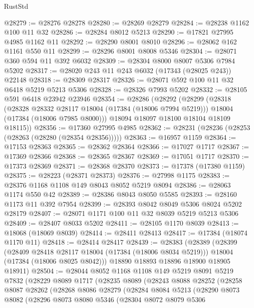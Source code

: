 \begin{lexlean}{RustStd}
\begin{coremodule}
@28279 := @28276 @28278
@28280 := @28269 @28279
@28284 := @28238 @1162 @100 @11 @32
@28286 := @28284 @8012 @5213
@28290 := @17821 @27995 @4985 @1162 @11
@28292 := @28290 @8001 @8010
@28296 := @28062 @162 @1161 @550 @11
@28299 := @28296 @8001 @8008 @5346
@28304 := @28071 @360 @594 @11 @392 @6032
@28309 := @28304 @8000 @8007 @5306 @7984 @5202
@28317 := @28020 @243 @11 @243 @6032 (@17343 (@28025 @243)) @22148
@28318 := @28309 @28317
@28326 := @28071 @592 @100 @11 @32 @6418 @5219 @5213 @5306
@28328 := @28326 @7993 @5202
@28332 := @28105 @591 @6418 @23942 @23946
@28354 := @28286
    (@28292
      (@28299
        (@28318
          (@28328 @28332 @28117 @18004 (@17384 (@18006 @7994 @5219)))
          @18004
          (@17384 (@18006 @7985 @8000)))
        @18094
        @18097
        @18100
        @18104
        @18109
        @18115))
@28356 := @17360 @27995 @4985
@28362 := @28231 (@28236 (@28253 (@28263 (@28280 (@28354 @28356)))))
@28363 := @16957 @1159
@28364 := @17153 @28363
@28365 := @28362 @28364
@28366 := @17027 @1717
@28367 := @17369 @28366
@28368 := @28365 @28367
@28369 := @17051 @1717
@28370 := @17373 @28369
@28371 := @28368 @28370
@28373 := @17378 (@17380 @1159)
@28375 := @28223 (@28371 @28373)
@28376 := @27998 @1175
@28383 := @28376 @1168 @1108 @149 @8043 @8052 @5219 @8094
@28386 := @28063 @1174 @550 @42
@28389 := @28386 @8043 @8050 @5585
@28393 := @28160 @1173 @11 @392 @7954
@28399 := @28393 @8042 @8049 @5306 @8024 @5202 @28179
@28407 := @28071 @1171 @100 @11 @32 @8039 @5219 @5213 @5306
@28409 := @28407 @8033 @5202
@28411 := @28105 @1170 @8039
@28413 := @18068 (@18069 @8039)
@28414 := @28411 @28413
@28417 := @17384 (@18074 @1170 @11)
@28418 := @28414 @28417
@28439 := @28383
    (@28389
      (@28399
        (@28409 @28418 @28117 @18004 (@17384 (@18006 @8034 @5219)))
        @18004
        (@17384 (@18006 @8025 @8042)))
      @18890
      @18893
      @18896
      @18900
      @18905
      @18911)
@28504 := @28044
    @8052
    @1168
    @1108
    @149
    @5219
    @8091
    @5219
    @7832
    (@28229
      @8089
      @1717
      (@28235
        @8089
        (@28243
          @8088
          @28252
          (@28258
            @8087
            @28262
            (@28268
              @8086
              @28279
              (@28284
                @8084
                @5213
                (@28290
                  @8073
                  @8082
                  (@28296
                    @8073
                    @8080
                    @5346
                    (@28304
                      @8072
                      @8079
                      @5306

\end{coremodule}
\end{lexlean}
